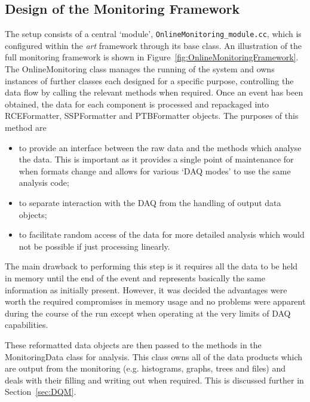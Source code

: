 \subsection{Design of the Monitoring Framework}\label{sec:MonitoringFrameworkDesign}

The setup consists of a central `module', \texttt{OnlineMonitoring\_module.cc}, which is configured within the \textit{art} framework through its base class.  An illustration of the full monitoring framework is shown in Figure~\ref{fig:OnlineMonitoringFramework}.  The OnlineMonitoring class manages the running of the system and owns instances of further classes each designed for a specific purpose, controlling the data flow by calling the relevant methods when required.  Once an event has been obtained, the data for each component is processed and repackaged into RCEFormatter, SSPFormatter and PTBFormatter objects.  The purposes of this method are
\begin{itemize}
\item to provide an interface between the raw data and the methods which analyse the data.  This is important as it provides a single point of maintenance for when formats change and allows for various `DAQ modes' to use the same analysis code;
\item to separate interaction with the DAQ from the handling of output data objects;
\item to facilitate random access of the data for more detailed analysis which would not be possible if just processing linearly.
\end{itemize}
The main drawback to performing this step is it requires all the data to be held in memory until the end of the event and represents basically the same information as initially present.  However, it was decided the advantages were worth the required compromises in memory usage and no problems were apparent during the course of the run except when operating at the very limits of DAQ capabilities.

These reformatted data objects are then passed to the methods in the MonitoringData class for analysis.  This class owns all of the data products which are output from the monitoring (e.g. histograms, graphs, trees and files) and deals with their filling and writing out when required.  This is discussed further in Section~\ref{sec:DQM}.

